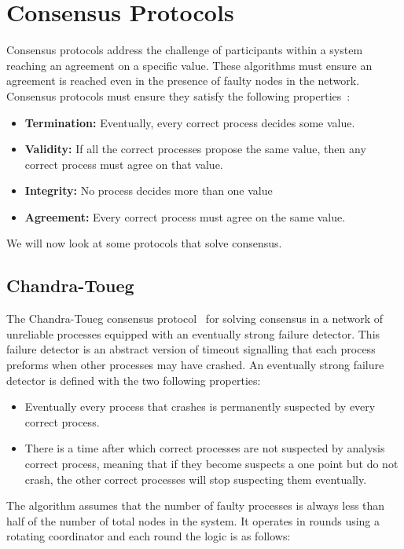 \section{Consensus Protocols}\label{sec:consensus}

Consensus protocols address the challenge of participants within a system reaching 
an agreement on a specific value.
These algorithms must ensure an agreement is reached
even in the presence of faulty nodes in the network. Consensus protocols must ensure
they satisfy the following properties~\cite{distributed_systems_concepts}:
\begin{itemize}
  \item \textbf{Termination:} Eventually, every correct process decides some value.
  \item \textbf{Validity:} If all the correct processes propose the same value,
then any correct process must agree on that value.
  \item \textbf{Integrity:} No process decides more than one value
  \item \textbf{Agreement:} Every correct process must agree on the same value.
\end{itemize}

We will now look at some protocols that solve consensus.

\subsection{Chandra-Toueg}\label{sub:chandra-toueg}

The Chandra-Toueg consensus protocol~\cite{chandra} for solving consensus in a network of
unreliable processes equipped with an eventually strong failure detector.
This failure detector is an abstract version of timeout signalling that each
process preforms when other processes may have crashed.
An eventually strong failure detector is defined with the two following properties:
\begin{itemize}
  \item Eventually every process that crashes is permanently suspected by every
correct process.
  \item There is a time after which correct processes are not suspected by analysis
correct process, meaning that if they become suspects a one point but do not crash,
the other correct processes will stop suspecting them eventually.
\end{itemize}

The algorithm assumes that the number of faulty processes is always less than half
of the number of total nodes in the system. It operates in rounds using a rotating
coordinator and each round the logic is as follows:

